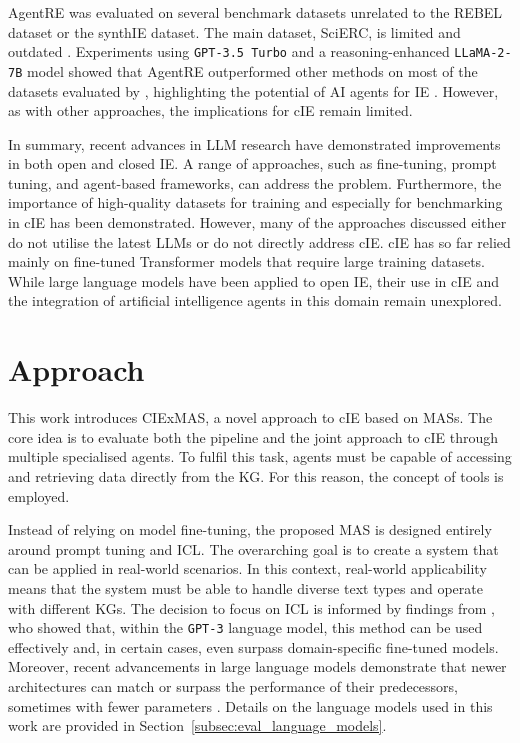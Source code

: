 \documentclass[a4paper,oneside,bibliography=totoc]{scrbook}
\begin{document}
AgentRE was evaluated on several benchmark datasets unrelated to the REBEL dataset or the synthIE dataset. The main dataset, SciERC, is limited and outdated \cite{Luan2018}. Experiments using \texttt{GPT-3.5 Turbo} and a reasoning-enhanced \linebreak\texttt{LLaMA-2-7B} model showed that AgentRE outperformed other methods on most of the datasets evaluated by \citet{Shi2024}, highlighting the potential of AI agents for \ac{IE} \cite{Shi2024}. However, as with other approaches, the implications for \ac{cIE} remain limited.

In summary, recent advances in \ac{LLM} research have demonstrated improvements in both open and closed \ac{IE}. A range of approaches, such as fine-tuning, prompt tuning, and agent-based frameworks, can address the problem. Furthermore, the importance of high-quality datasets for training and especially for benchmarking in \ac{cIE} has been demonstrated. However, many of the approaches discussed either do not utilise the latest \acp{LLM} or do not directly address \ac{cIE}. \Ac{cIE} has so far relied mainly on fine-tuned Transformer models that require large training datasets. While large language models have been applied to open \ac{IE}, their use in \ac{cIE} and the integration of artificial intelligence agents in this domain remain unexplored.

\chapter{Approach}
\label{ch:approach}

This work introduces CIExMAS, a novel approach to \ac{cIE} based on \acp{MAS}. The core idea is to evaluate both the pipeline and the joint approach to \ac{cIE} through multiple specialised agents. To fulfil this task, agents must be capable of accessing and retrieving data directly from the \ac{KG}. For this reason, the concept of tools is employed.

Instead of relying on model fine-tuning, the proposed \ac{MAS} is designed entirely around prompt tuning and \ac{ICL}. The overarching goal is to create a system that can be applied in real-world scenarios. In this context, real-world applicability means that the system must be able to handle diverse text types and operate with different \acp{KG}. The decision to focus on \ac{ICL} is informed by findings from \citet{Brown2020}, who showed that, within the \texttt{GPT-3} language model, this method can be used effectively and, in certain cases, even surpass domain-specific fine-tuned models. Moreover, recent advancements in large language models demonstrate that newer architectures can match or surpass the performance of their predecessors, sometimes with fewer parameters \cite{MetaAI2025,Chiang2024}. Details on the language models used in this work are provided in Section~\ref{subsec:eval_language_models}.
\end{document}
